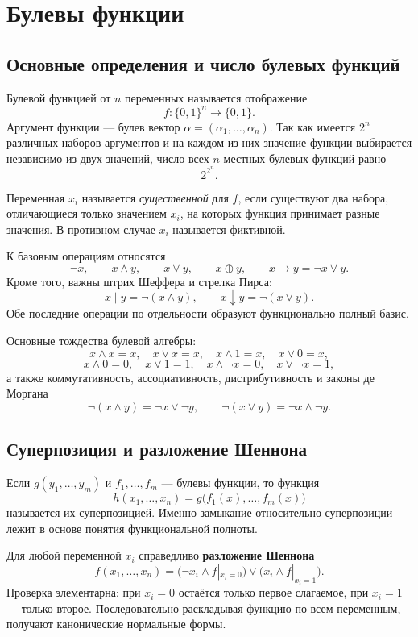 \section{Булевы функции}
\label{sec:boolean-functions}

\subsection{Основные определения и число булевых функций}

Булевой функцией от $n$ переменных называется отображение
\[
    f\colon \{0,1\}^{n}\to\{0,1\}.
\]
Аргумент функции --- булев вектор $\alpha=(\alpha_1,\ldots,\alpha_n)$.
Так как имеется $2^n$ различных наборов аргументов и на каждом из них значение
функции выбирается независимо из двух значений, число всех $n$-местных булевых
функций равно
\[
    2^{2^n}.
\]

Переменная $x_i$ называется \emph{существенной} для $f$, если существуют два
набора, отличающиеся только значением $x_i$, на которых функция принимает разные
значения. В противном случае $x_i$ называется фиктивной.

К базовым операциям относятся
\[
 \neg x,\qquad x\land y,\qquad x\lor y,\qquad x\oplus y,
 \qquad x\to y=\neg x\lor y.
\]
Кроме того, важны штрих Шеффера и стрелка Пирса:
\[
 x\mid y=\neg(x\land y),\qquad
 x\downarrow y=\neg(x\lor y).
\]
Обе последние операции по отдельности образуют функционально полный базис.

Основные тождества булевой алгебры:
\[
 x\land x=x,\quad x\lor x=x,\quad
 x\land 1=x,\quad x\lor0=x,
\]
\[
 x\land0=0,\quad x\lor1=1,\quad
 x\land\neg x=0,\quad x\lor\neg x=1,
\]
а также коммутативность, ассоциативность, дистрибутивность и законы де Моргана
\[
 \neg(x\land y)=\neg x\lor\neg y,
 \qquad
 \neg(x\lor y)=\neg x\land\neg y.
\]

\subsection{Суперпозиция и разложение Шеннона}

Если $g(y_1,\ldots,y_m)$ и $f_1,\ldots,f_m$ --- булевы функции, то функция
\[
 h(x_1,\ldots,x_n)=g\bigl(f_1(x),\ldots,f_m(x)\bigr)
\]
называется их суперпозицией. Именно замыкание относительно суперпозиции лежит в
основе понятия функциональной полноты.

Для любой переменной $x_i$ справедливо \textbf{разложение Шеннона}
\[
 f(x_1,\ldots,x_n)=
 \bigl(\neg x_i\land f|_{x_i=0}\bigr)
 \lor
 \bigl(x_i\land f|_{x_i=1}\bigr).
\]
Проверка элементарна: при $x_i=0$ остаётся только первое слагаемое, при $x_i=1$
--- только второе. Последовательно раскладывая функцию по всем переменным,
получают канонические нормальные формы.

